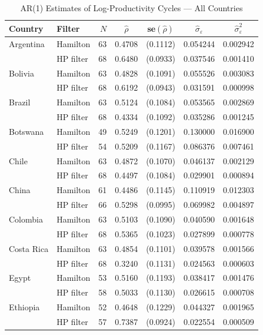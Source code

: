 \begin{table}[htbp]
  \centering
  \caption{AR(1) Estimates of Log-Productivity Cycles --- All Countries}
  \label{tab:ar1_productivity_all}
  \begin{tabular}{llrcccc}
    \toprule
    Country & Filter & $N$ & $\hat{\rho}$ & se$(\hat{\rho})$ & $\hat{\sigma}_{\varepsilon}$ & $\hat{\sigma}^2_{\varepsilon}$ \\
    \midrule
    Argentina & Hamilton & 63 & 0.4708 & (0.1112) & 0.054244 & 0.002942 \\
    & HP filter & 68 & 0.6480 & (0.0933) & 0.037546 & 0.001410 \\[3pt]
    Bolivia & Hamilton & 63 & 0.4828 & (0.1091) & 0.055526 & 0.003083 \\
    & HP filter & 68 & 0.6192 & (0.0943) & 0.031591 & 0.000998 \\[3pt]
    Brazil & Hamilton & 63 & 0.5124 & (0.1084) & 0.053565 & 0.002869 \\
    & HP filter & 68 & 0.4334 & (0.1092) & 0.035286 & 0.001245 \\[3pt]
    Botswana & Hamilton & 49 & 0.5249 & (0.1201) & 0.130000 & 0.016900 \\
    & HP filter & 54 & 0.5209 & (0.1167) & 0.086376 & 0.007461 \\[3pt]
    Chile & Hamilton & 63 & 0.4872 & (0.1070) & 0.046137 & 0.002129 \\
    & HP filter & 68 & 0.4497 & (0.1084) & 0.029901 & 0.000894 \\[3pt]
    China & Hamilton & 61 & 0.4486 & (0.1145) & 0.110919 & 0.012303 \\
    & HP filter & 66 & 0.5298 & (0.0995) & 0.069982 & 0.004897 \\[3pt]
    Colombia & Hamilton & 63 & 0.5103 & (0.1090) & 0.040590 & 0.001648 \\
    & HP filter & 68 & 0.5365 & (0.1023) & 0.027899 & 0.000778 \\[3pt]
    Costa Rica & Hamilton & 63 & 0.4854 & (0.1101) & 0.039578 & 0.001566 \\
    & HP filter & 68 & 0.3240 & (0.1131) & 0.024563 & 0.000603 \\[3pt]
    Egypt & Hamilton & 53 & 0.5160 & (0.1193) & 0.038417 & 0.001476 \\
    & HP filter & 58 & 0.5033 & (0.1130) & 0.026615 & 0.000708 \\[3pt]
    Ethiopia & Hamilton & 52 & 0.4648 & (0.1229) & 0.044327 & 0.001965 \\
    & HP filter & 57 & 0.7387 & (0.0924) & 0.022554 & 0.000509 \\[3pt]

\end{tabular}
\end{table}
